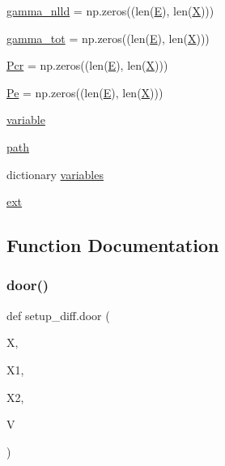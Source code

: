 \begin{DoxyCompactItemize}
\item 
\hyperlink{namespacesetup__diff_aee21b548bf17144225ef9590e7f5ad2f}{gamma\+\_\+nlld} = np.\+zeros((len(\hyperlink{namespacesetup__diff_aa5cb1501a25fe4b39a92f30f468e71e8}{E}), len(\hyperlink{namespacesetup__diff_ad01f7c1ee607d8a67926e30be25385f1}{X})))
\item 
\hyperlink{namespacesetup__diff_a14ad390922cb53ce9a6e36452ef223c7}{gamma\+\_\+tot} = np.\+zeros((len(\hyperlink{namespacesetup__diff_aa5cb1501a25fe4b39a92f30f468e71e8}{E}), len(\hyperlink{namespacesetup__diff_ad01f7c1ee607d8a67926e30be25385f1}{X})))
\item 
\hyperlink{namespacesetup__diff_a650c623410887159dce34e61efc89c59}{Pcr} = np.\+zeros((len(\hyperlink{namespacesetup__diff_aa5cb1501a25fe4b39a92f30f468e71e8}{E}), len(\hyperlink{namespacesetup__diff_ad01f7c1ee607d8a67926e30be25385f1}{X})))
\item 
\hyperlink{namespacesetup__diff_a94020cf7d43c7acff9ac947087bf67e6}{Pe} = np.\+zeros((len(\hyperlink{namespacesetup__diff_aa5cb1501a25fe4b39a92f30f468e71e8}{E}), len(\hyperlink{namespacesetup__diff_ad01f7c1ee607d8a67926e30be25385f1}{X})))
\item 
\hyperlink{namespacesetup__diff_ae00dc4334653d7a88a9ed6cb21e05d8d}{variable}
\item 
\hyperlink{namespacesetup__diff_a4d4a16bbcad1ca9492b55a413817ecb1}{path}
\item 
dictionary \hyperlink{namespacesetup__diff_a23282dde4ea089cf158422ee5386fc38}{variables}
\item 
\hyperlink{namespacesetup__diff_a68f10ace87e537cf2df9227f8bd6f403}{ext}
\end{DoxyCompactItemize}


\subsection{Function Documentation}
\mbox{\label{namespacesetup__diff_a4c73aaba178aa74240a75b7a6a86e4c6}} 
\subsubsection{\texorpdfstring{door()}{door()}}
{\footnotesize\ttfamily def setup\+\_\+diff.\+door (\begin{DoxyParamCaption}\item[{}]{X,  }\item[{}]{X1,  }\item[{}]{X2,  }\item[{}]{V }\end{DoxyParamCaption})}



